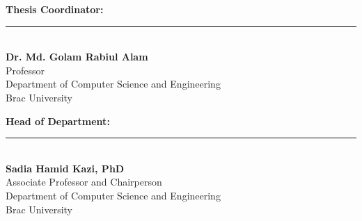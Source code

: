 \noindent
\begin{minipage}[t]{0.33\textwidth}\raggedright
    \textbf{Thesis Coordinator:}\\
\end{minipage}
\hfill
\begin{minipage}[t]{0.62\textwidth}
    \centering

    \vspace{1.0cm}

    \rule{6.5cm}{0.4pt}\\
    \textbf{Dr. Md. Golam Rabiul Alam}\\
    Professor\\
    Department of Computer Science and Engineering\\
    Brac University
\end{minipage}

\vspace{0.8cm}



\noindent
\begin{minipage}[t]{0.33\textwidth}\raggedright
    \textbf{Head of Department:}\\
\end{minipage}
\hfill
\begin{minipage}[t]{0.62\textwidth}
    \centering

    \vspace{1.0cm}

    \rule{6.5cm}{0.4pt}\\
    \textbf{Sadia Hamid Kazi, PhD}\\
    Associate Professor and Chairperson\\
    Department of Computer Science and Engineering\\
    Brac University
\end{minipage}

\clearpage